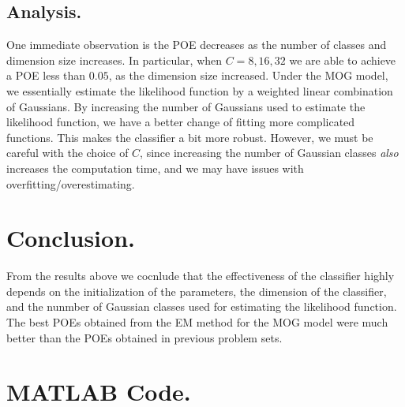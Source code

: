 \documentclass[10pt]{article}
\begin{document}
\subsection{Analysis.}
One immediate observation is the POE decreases as the number of classes and dimension size increases. In particular, when $C = 8,16,32$ we are able to achieve a POE less than $0.05$, as the dimension size increased. Under the MOG model, we essentially estimate the likelihood function by a weighted linear combination of Gaussians. By increasing the number of Gaussians used to estimate the likelihood function, we have a better change of fitting more complicated functions. This makes the classifier a bit more robust. However, we must be careful with the choice of $C$, since increasing the number of Gaussian classes \textit{also} increases the computation time, and we may have issues with overfitting/overestimating. 
\section{Conclusion.}
From the results above we cocnlude that the effectiveness of the classifier highly depends on the initialization of the parameters, the dimension of the classifier, and the nunmber of Gaussian classes used for estimating the likelihood function. The best POEs obtained from the EM method for the MOG model were much better than the POEs obtained in previous problem sets.
\section{MATLAB Code.} 






\end{document}
